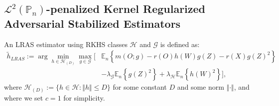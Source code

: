 \documentclass[twoside,11pt]{article}
\newcommand{\E}{\mathbb{E}}
\newcommand{\mc}{\mathcal}
\begin{document}





\subsection{$\mc{L}^2(\mathbb{P}_n)$-penalized Kernel Regularized Adversarial Stabilized Estimators}\label{sec:compare_ras}

An LRAS estimator using RKHS classes $\mc{H}$ and $\mc{G}$ is defined as:
\begin{align*}
\tilde h_{LRAS}:=\arg\min_{h\in\mc{H}_{(D)}}\max_{g\in\mc{G}}\Big[&\E_n\left\{m(O;g)-r(O)h(W)g(Z)-r(X)g(Z)^2\right\}\\
&-\lambda_{\mc{G}}\E_n\left\{ g(Z)^2\right\}+\lambda_{\mc{H}}\E_n\left\{ h(W)^2\right\}\Big]\nonumber,
\end{align*}
where $\mc{H}_{(D)}:=\{h\in\mc{H}:\Vert h\Vert\le D\}$ for some constant $D$ and some norm $\Vert \cdot \Vert$, and where we set $c=1$ for simplicity.
\end{document}
